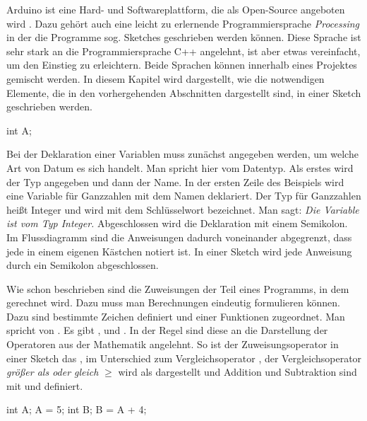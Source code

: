 Arduino ist eine Hard- und Softwareplattform, die als Open-Source angeboten wird . Dazu gehört auch eine leicht zu erlernende 
Programmiersprache \textit{Processing} in der die Programme sog. Sketches geschrieben werden können. Diese Sprache ist sehr stark an die Programmiersprache 
C++ angelehnt, ist aber etwas vereinfacht, um den Einstieg zu erleichtern. Beide Sprachen können innerhalb eines Projektes gemischt werden.
In diesem Kapitel wird dargestellt, wie die notwendigen Elemente, die in den vorhergehenden Abschnitten dargestellt sind, in einer Sketch geschrieben werden.



\begin{src}
int A;
\end{src}

Bei der Deklaration einer Variablen muss zunächst angegeben werden, um welche Art von Datum es sich handelt. Man spricht hier vom Datentyp. 
Als erstes wird der Typ angegeben und dann der Name. In der ersten Zeile des Beispiels wird eine Variable für Ganzzahlen mit dem Namen  deklariert. 
Der Typ für Ganzzahlen heißt Integer und wird mit dem Schlüsselwort  bezeichnet. Man sagt: 
\textit{Die Variable  ist vom Typ Integer.} Abgeschlossen wird die Deklaration mit einem Semikolon.
Im Flussdiagramm sind die Anweisungen dadurch voneinander abgegrenzt, dass jede in einem eigenen Kästchen notiert ist. 
In einer Sketch wird jede Anweisung durch ein Semikolon abgeschlossen.

\vfill\null\columnbreak
{}
Wie schon beschrieben sind die Zuweisungen der Teil eines Programms, in dem gerechnet wird. Dazu muss man Berechnungen eindeutig formulieren können. 
Dazu sind bestimmte Zeichen definiert und einer Funktionen zugeordnet. Man spricht von . 
Es gibt ,  und . 
In der Regel sind diese an die Darstellung der Operatoren aus der Mathematik angelehnt. 
So ist der Zuweisungsoperator in einer Sketch das \code{=}, im Unterschied zum Vergleichsoperator \code{==}, 
der Vergleichsoperator \textit{größer als oder gleich} $\geq$ wird als \code{>=} dargestellt und Addition und Subtraktion sind mit 
\code{+} und \code{-} definiert.

\begin{src}
int A;
A = 5;
int B;
B = A + 4;
\end{src}

